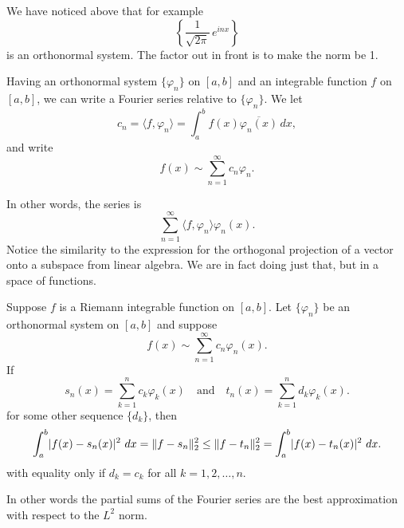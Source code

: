 We have noticed above that for example
\begin{equation*}
\left\{ \frac{1}{\sqrt{2\pi}} \, e^{inx} \right\}
\end{equation*}
is an orthonormal system.  The factor out in front is to make the norm be 1.

Having an orthonormal system $\{ \varphi_n \}$ on $[a,b]$ and an integrable function $f$
on $[a,b]$, we can write
a Fourier series relative to $\{ \varphi_n \}$.  We let
\begin{equation*}
c_n =
\langle f , \varphi_n \rangle
=
\int_a^b f(x) \overline{\varphi_n(x)}\,dx ,
\end{equation*}
and write
\begin{equation*}
f(x) \sim \sum_{n=1}^\infty c_n \varphi_n .
\end{equation*}

In other words, the series is
\begin{equation*}
\sum_{n=1}^\infty \langle f , \varphi_n \rangle \varphi_n(x) .
\end{equation*}
Notice the similarity to the expression for the orthogonal
projection of a vector onto a subspace from linear algebra.  We are
in fact doing just that, but in a space of functions.

\begin{thm} \label{thm:l2bestapprox}
Suppose $f$ is a Riemann integrable function on $[a,b]$.
Let $\{ \varphi_n \}$ be an orthonormal system on $[a,b]$ and
suppose
\begin{equation*}
f(x) \sim \sum_{n=1}^\infty c_n \varphi_n(x) .
\end{equation*}
If
\begin{equation*}
s_n (x) = \sum_{k=1}^n c_k \varphi_k(x)
\quad\text{and}\quad
t_n (x) = \sum_{k=1}^n d_k \varphi_k(x) .
\end{equation*}
for some other sequence $\{ d_k \}$, then
\begin{equation*}
\int_a^b \lvert {f(x)-s_n(x)} \rvert^2 ~ dx = \lVert {f-s_n} \rVert_2^2 \leq
\lVert {f-t_n} \rVert_2^2 = \int_a^b \lvert {f(x)-t_n(x)} \rvert^2 ~ dx .
\end{equation*}
with equality only if $d_k = c_k$ for all $k=1,2,\ldots,n$.
\end{thm}

In other words the partial sums of the Fourier series are the best approximation with respect to the
$L^2$ norm.

